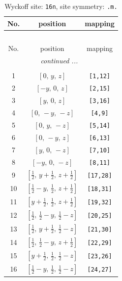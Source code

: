 \documentclass[fleqn,8pt]{jsarticle}
\begin{document}
\renewcommand{\arraystretch}{1.2}
\begin{longtable}{ccc}
\caption{Wyckoff site: {\tt 16n}, site symmetry: {\tt .m.}}
 \\
 \hline \hline
No. & position & mapping \\ \hline \endfirsthead

\multicolumn{2}{l}{\tablename\ \thetable{}} \\
 \hline \hline
No. & position & mapping \\ \hline \endhead

 \hline \hline
\multicolumn{2}{r}{\footnotesize\it continued ...} \\ \endfoot

 \hline \hline
\multicolumn{2}{r}{} \\ \endlastfoot

1 & $\left[ 0,\, y,\, z \right]$ & {\tt [1,12]} \\ \hline
2 & $\left[ - y,\, 0,\, z \right]$ & {\tt [2,15]} \\ \hline
3 & $\left[ y,\, 0,\, z \right]$ & {\tt [3,16]} \\ \hline
4 & $\left[ 0,\, - y,\, - z \right]$ & {\tt [4,9]} \\ \hline
5 & $\left[ 0,\, y,\, - z \right]$ & {\tt [5,14]} \\ \hline
6 & $\left[ 0,\, - y,\, z \right]$ & {\tt [6,13]} \\ \hline
7 & $\left[ y,\, 0,\, - z \right]$ & {\tt [7,10]} \\ \hline
8 & $\left[ - y,\, 0,\, - z \right]$ & {\tt [8,11]} \\ \hline
9 & $\left[ \frac{1}{2},\, y + \frac{1}{2},\, z + \frac{1}{2} \right]$ & {\tt [17,28]} \\ \hline
10 & $\left[ \frac{1}{2} - y,\, \frac{1}{2},\, z + \frac{1}{2} \right]$ & {\tt [18,31]} \\ \hline
11 & $\left[ y + \frac{1}{2},\, \frac{1}{2},\, z + \frac{1}{2} \right]$ & {\tt [19,32]} \\ \hline
12 & $\left[ \frac{1}{2},\, \frac{1}{2} - y,\, \frac{1}{2} - z \right]$ & {\tt [20,25]} \\ \hline
13 & $\left[ \frac{1}{2},\, y + \frac{1}{2},\, \frac{1}{2} - z \right]$ & {\tt [21,30]} \\ \hline
14 & $\left[ \frac{1}{2},\, \frac{1}{2} - y,\, z + \frac{1}{2} \right]$ & {\tt [22,29]} \\ \hline
15 & $\left[ y + \frac{1}{2},\, \frac{1}{2},\, \frac{1}{2} - z \right]$ & {\tt [23,26]} \\ \hline
16 & $\left[ \frac{1}{2} - y,\, \frac{1}{2},\, \frac{1}{2} - z \right]$ & {\tt [24,27]} \\
\end{longtable}
\end{document}
